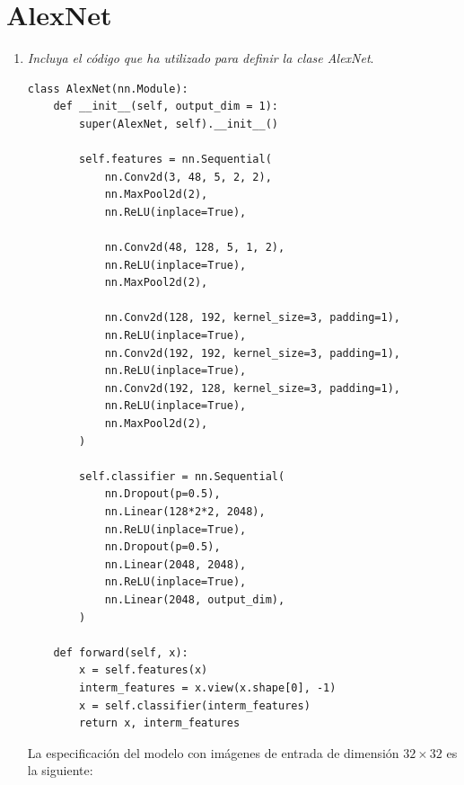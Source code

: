 \documentclass[11pt]{article}
\begin{document}
\section{AlexNet}
\begin{enumerate}
    \item \emph{Incluya el código que ha utilizado para definir la clase AlexNet}.
        \begin{verbatim}
class AlexNet(nn.Module):
    def __init__(self, output_dim = 1):
        super(AlexNet, self).__init__()
        
        self.features = nn.Sequential(
            nn.Conv2d(3, 48, 5, 2, 2),
            nn.MaxPool2d(2),
            nn.ReLU(inplace=True),

            nn.Conv2d(48, 128, 5, 1, 2),
            nn.ReLU(inplace=True),
            nn.MaxPool2d(2),

            nn.Conv2d(128, 192, kernel_size=3, padding=1),
            nn.ReLU(inplace=True),
            nn.Conv2d(192, 192, kernel_size=3, padding=1),
            nn.ReLU(inplace=True),
            nn.Conv2d(192, 128, kernel_size=3, padding=1),
            nn.ReLU(inplace=True),
            nn.MaxPool2d(2),
        )
        
        self.classifier = nn.Sequential(
            nn.Dropout(p=0.5),
            nn.Linear(128*2*2, 2048),
            nn.ReLU(inplace=True),
            nn.Dropout(p=0.5),
            nn.Linear(2048, 2048),
            nn.ReLU(inplace=True),
            nn.Linear(2048, output_dim),
        )

    def forward(self, x):
        x = self.features(x)
        interm_features = x.view(x.shape[0], -1)
        x = self.classifier(interm_features)
        return x, interm_features
        \end{verbatim}

        La especificación del modelo con imágenes de entrada de dimensión \( 32 \times 32 \) es la siguiente:


\end{enumerate}
\end{document}
